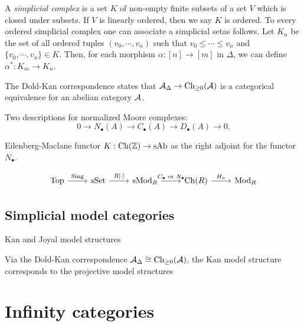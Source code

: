 \documentclass{../../large}
\begin{document}
\begin{prb}
\end{prb}

\begin{prb}
A \emph{simplicial complex} is a set $K$ of non-empty finite subsets of a set $V$ which is closed under subsets.
If $V$ is linearly ordered, then we say $K$ is ordered.
To every ordered simplicial complex one can associate a simplicial setas follows.
Let $K_n$ be the set of all ordered tuples $(v_0,\cdots,v_n)$ such that $v_0\le\cdots\le v_n$ and $\{v_0,\cdots,v_n\}\in K$.
Then, for each morphism $\alpha:[n]\to[m]$ in $\Delta$, we can define $\alpha^*:K_m\to K_n$.

\end{prb}


\begin{prb}
The Dold-Kan correspondence states that $\mathcal{A}_\Delta\to\mathrm{Ch}_{\ge0}(\mathcal{A})$ is a categorical equivalence for an abelian category $\mathcal{A}$.

Two descriptions for normalized Moore complexes:
\[0\to N_\bullet(A)\to C_\bullet(A)\to D_\bullet(A)\to0.\]


Eilenberg-Maclane functor $K:\mathrm{Ch}(\mathbb{Z})\to\mathrm{sAb}$ as the right adjoint for the functor $N_\bullet$.
\end{prb}



\[\begin{tikzcd}
\mathrm{Top} \rar{\mathrm{Sing}} &
\mathrm{sSet} \rar{R[\cdot]} &
\mathrm{sMod}_R \rar{C_\bullet\text{ or }N_\bullet} &
\mathrm{Ch}(R) \rar{H_n} &
\mathrm{Mod}_R
\end{tikzcd}\]




\section{Simplicial model categories}
\begin{prb}
Kan and Joyal model structures


Via the Dold-Kan correspondence $\mathcal{A}_\Delta\cong\mathrm{Ch}_{\ge0}(\mathcal{A})$, the Kan model structure corresponds to the projective model structures
\end{prb}




\chapter{Infinity categories}
\end{document}
